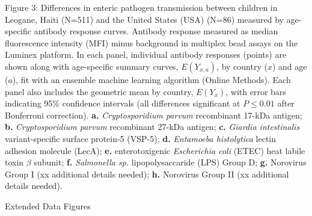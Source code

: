 \documentclass[11pt]{article}
\begin{document}
\clearpage
Figure 3: Differences in enteric pathogen transmission between children in Leogane, Haiti (N=511) and the United States (USA) (N=86) measured by age-specific antibody response curves. Antibody response measured as median fluorescence intensity (MFI) minus background in multiplex bead assays on the Luminex platform. In each panel, individual antibody responses (points) are shown along with age-specific summary curves, $E(Y_{x,a})$, by country ($x$) and age ($a$), fit with an ensemble machine learning algorithm (Online Methods). Each panel also includes the geometric mean by country, $E(Y_{x})$, with error bars indicating 95\% confidence intervals (all differences significant at $P\leq0.01$ after Bonferroni correction).
\textbf{a.} \textit{Cryptosporidium parvum} recombinant 17-kDa antigen;
\textbf{b.} \textit{Cryptosporidium parvum} recombinant 27-kDa antigen;
\textbf{c.} \textit{Giardia intestinalis} variant-specific surface protein-5 (VSP-5);
\textbf{d.} \textit{Entamoeba histolytica} lectin adhesion molecule (LecA);
\textbf{e.} enterotoxigenic \textit{Escherichia coli} (ETEC) heat labile toxin $\beta$ subunit;
\textbf{f.} \textit{Salmonella sp.} lipopolysaccaride (LPS) Group D;
\textbf{g.} Norovirus Group I (xx additional details needed);
\textbf{h.} Norovirus Group II (xx additional details needed).

\clearpage
\begin{center}
{\Large Extended Data Figures}
\end{center}
\vspace{50pt}

\setcounter{figure}{0} 
\end{document}
